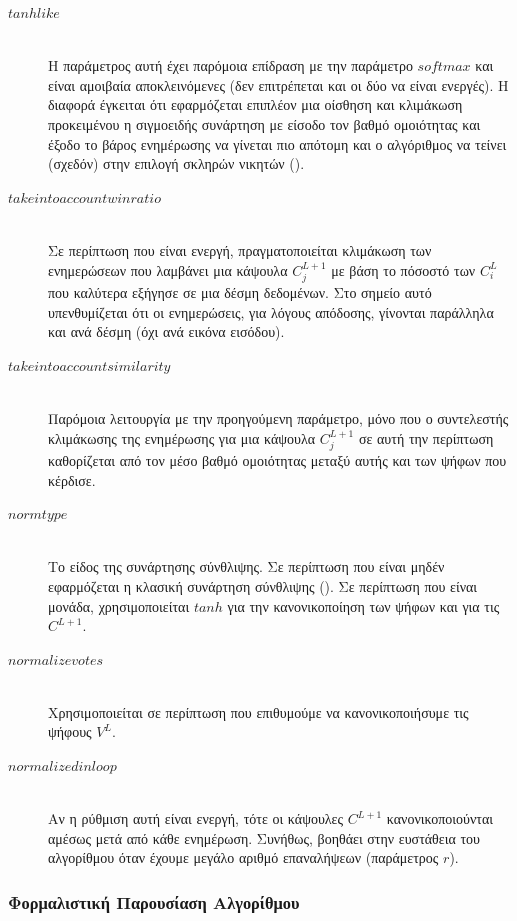 \begin{description}
  \item[$tanh like$] \hfill \\ Η παράμετρος αυτή έχει παρόμοια επίδραση με την παράμετρο $softmax$ και είναι αμοιβαία αποκλεινόμενες (δεν επιτρέπεται και οι δύο να είναι ενεργές). Η διαφορά έγκειται ότι εφαρμόζεται επιπλέον μια οίσθηση και κλιμάκωση προκειμένου η σιγμοειδής συνάρτηση με είσοδο τον βαθμό ομοιότητας και έξοδο το βάρος ενημέρωσης να γίνεται πιο απότομη και ο αλγόριθμος να τείνει (σχεδόν) στην επιλογή σκληρών νικητών ().
  \item[$take into account win ratio$] \hfill \\ Σε περίπτωση που είναι ενεργή, πραγματοποιείται κλιμάκωση των ενημερώσεων που λαμβάνει μια κάψουλα $C^{L+1}_j$ με βάση το πόσοστό των $C^L_i$ που καλύτερα εξήγησε σε μια δέσμη δεδομένων. Στο σημείο αυτό υπενθυμίζεται ότι οι ενημερώσεις, για λόγους απόδοσης, γίνονται παράλληλα και ανά δέσμη (όχι ανά εικόνα εισόδου).
  \item[$take into account similarity$] \hfill \\ Παρόμοια λειτουργία με την προηγούμενη παράμετρο, μόνο που ο συντελεστής κλιμάκωσης της ενημέρωσης για μια κάψουλα $C_j^{L+1}$ σε αυτή την περίπτωση καθορίζεται από τον μέσο βαθμό ομοιότητας μεταξύ αυτής και των ψήφων που κέρδισε.
  \item[$norm type$] \hfill \\ Το είδος της συνάρτησης σύνθλιψης. Σε περίπτωση που είναι μηδέν εφαρμόζεται η κλασική συνάρτηση σύνθλιψης (). Σε περίπτωση που είναι μονάδα, χρησιμοποιείται $tanh$  για την κανονικοποίηση των ψήφων και  για τις $C^{L+1}$.
  \item[$normalize votes$] \hfill \\ Χρησιμοποιείται σε περίπτωση που επιθυμούμε να κανονικοποιήσυμε τις ψήφους $V^L$.
  \item[$normalize d in loop$] \hfill \\ Αν η ρύθμιση αυτή είναι ενεργή, τότε οι κάψουλες $C^{L+1}$ κανονικοποιούνται αμέσως μετά από κάθε ενημέρωση. Συνήθως, βοηθάει στην ευστάθεια του αλγορίθμου όταν έχουμε μεγάλο αριθμό επαναλήψεων (παράμετρος $r$).
\end{description}

\subsubsection{Φορμαλιστική Παρουσίαση Αλγορίθμου}


